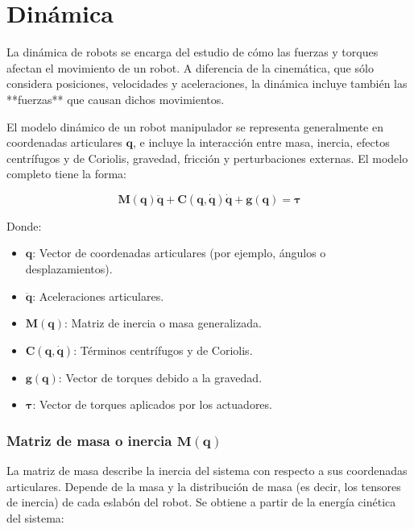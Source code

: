 \section{Dinámica} \label{sec:dinamica}

La dinámica de robots se encarga del estudio de cómo las fuerzas y torques afectan el movimiento de un robot. A diferencia de la cinemática, que sólo considera posiciones, velocidades y aceleraciones, la dinámica incluye también las **fuerzas** que causan dichos movimientos.

El modelo dinámico de un robot manipulador se representa generalmente en coordenadas articulares \( \mathbf{q} \), e incluye la interacción entre masa, inercia, efectos centrífugos y de Coriolis, gravedad, fricción y perturbaciones externas. El modelo completo tiene la forma:

\begin{equation}
	\mathbf{M}(\mathbf{q})\ddot{\mathbf{q}} + \mathbf{C}(\mathbf{q}, \dot{\mathbf{q}})\dot{\mathbf{q}} + \mathbf{g}(\mathbf{q}) = \boldsymbol{\tau}
\end{equation}

Donde:

\begin{itemize}
	\item \( \mathbf{q} \): Vector de coordenadas articulares (por ejemplo, ángulos o desplazamientos).
	\item \( \ddot{\mathbf{q}} \): Aceleraciones articulares.
	\item \( \mathbf{M}(\mathbf{q}) \): Matriz de inercia o masa generalizada.
	\item \( \mathbf{C}(\mathbf{q}, \dot{\mathbf{q}}) \): Términos centrífugos y de Coriolis.
	\item \( \mathbf{g}(\mathbf{q}) \): Vector de torques debido a la gravedad.
	\item \( \boldsymbol{\tau} \): Vector de torques aplicados por los actuadores.
\end{itemize}

\subsubsection{Matriz de masa o inercia \( \mathbf{M}(\mathbf{q}) \)}

La matriz de masa describe la inercia del sistema con respecto a sus coordenadas articulares. Depende de la masa y la distribución de masa (es decir, los tensores de inercia) de cada eslabón del robot. Se obtiene a partir de la energía cinética del sistema:

